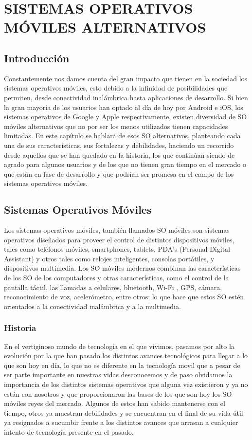 \chapter*{SISTEMAS OPERATIVOS MÓVILES ALTERNATIVOS}

\section*{Introducción}
Constantemente nos damos cuenta del gran impacto que tienen en la sociedad los sistemas operativos móviles, esto debido a la infinidad 
de posibilidades que permiten, desde conectividad inalámbrica hasta aplicaciones de desarrollo. Si bien la gran mayoría de los usuarios 
han optado al día de hoy por Android e iOS, los sistemas operativos de Google y Apple respectivamente, existen diversidad de SO móviles 
alternativos que no por ser los menos utilizados tienen capacidades limitadas. En este capítulo se hablará de esos SO alternativos, 
planteando cada una de sus características, sus fortalezas y debilidades, haciendo un recorrido desde aquellos que se han quedado en la 
historia, los que continúan siendo de agrado para algunos usuarios y de los que no tienen gran tiempo en el mercado o que están en fase 
de desarrollo y que podrían ser promesa en el campo de los sistemas operativos móviles.

\section*{Sistemas Operativos Móviles}
Los sistemas operativos móviles, también llamados SO móviles son sistemas operativos diseñados para proveer el control de distintos dispositivos móviles, tales como 
teléfonos móviles, smartphones, tablets, PDA’s (Personal Digital Assistant) y otros tales como relojes inteligentes, consolas portátiles, y dispositivos multimedia. Los SO 
móviles modernos combinan las características de los SO de los computadores y otras características, como el control de la pantalla táctil, las llamadas a celulares, 
bluetooth, Wi-Fi , GPS, cámara, reconocimiento de voz, acelerómetro, entre otros; lo que hace que estos SO estén orientados a la conectividad inalámbrica y a la multimedia.

\subsection*{Historia}
En el vertiginoso mundo de tecnología en el que vivimos, pasamos por alto la evolución por la que han pasado los distintos avances tecnológicos para llegar a lo que son hoy 
en día, lo que no es diferente en la tecnología movil que a pesar de ser parte importante en nuestras vidas desconocemos y de paso olvidamos la importancia de los distintos 
sistemas operativos que alguna vez existieron y ya no están con nosotros y que proporcionaron las bases de los que son hoy los SO móviles reyes del mercado. Algunos de 
estos han sabido mantenerse con el tiempo, otros ya muestran debilidades y se encuentran en el final de su vida útil ya resignados a sucumbir frente a los distintos avances 
que arrasan a cualquier intento de tecnología presente en el pasado.

